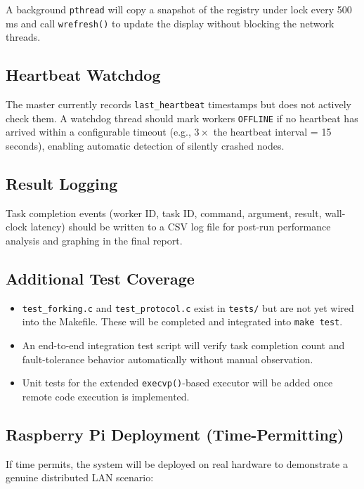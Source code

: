 \documentclass[12pt,a4paper]{article}
\begin{document}
A background \texttt{pthread} will copy a snapshot of the registry under lock every 500\,ms
and call \texttt{wrefresh()} to update the display without blocking the network threads.

\subsection{Heartbeat Watchdog}

The master currently records \texttt{last\_heartbeat} timestamps but does not actively
check them. A watchdog thread should mark workers \texttt{OFFLINE} if no heartbeat has
arrived within a configurable timeout (e.g., $3\times$ the heartbeat interval = 15 seconds),
enabling automatic detection of silently crashed nodes.

\subsection{Result Logging}

Task completion events (worker ID, task ID, command, argument, result, wall-clock latency)
should be written to a CSV log file for post-run performance analysis and graphing in the
final report.

\subsection{Additional Test Coverage}

\begin{itemize}[noitemsep]
    \item \texttt{test\_forking.c} and \texttt{test\_protocol.c} exist in \texttt{tests/} but are not yet wired into the Makefile. These will be completed and integrated into \texttt{make test}.
    \item An end-to-end integration test script will verify task completion count and
          fault-tolerance behavior automatically without manual observation.
    \item Unit tests for the extended \texttt{execvp()}-based executor will be added once
          remote code execution is implemented.
\end{itemize}

\subsection{Raspberry Pi Deployment (Time-Permitting)}

If time permits, the system will be deployed on real hardware to demonstrate a genuine
distributed LAN scenario:
\end{document}
